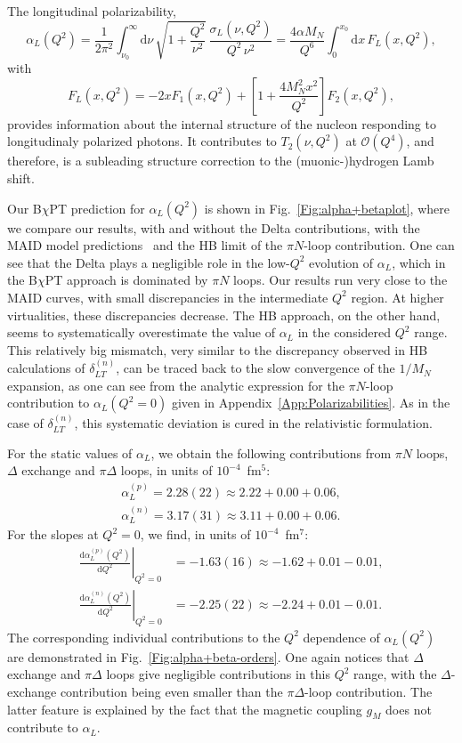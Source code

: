 \documentclass[12pt,preprint,tightenlines,
showpacs,preprintnumbers,amsmath,amssymb,
a4paper,nofootinbib]{revtex4-1}
\def\beq{\begin{equation}}
\def\eeq{\end{equation}}
\def\al{\alpha}
\def\nn{\nonumber}
\def\dd{\mathrm{d}}
\begin{document}
The longitudinal polarizability,
\beq
\alpha_L (Q^2)= \frac{1}{2 \pi^2} \int_{\nu_0}^\infty\! \dd\nu\,\sqrt{1+\frac{Q^2}{\nu^{2}}}\,            \frac{\sigma_L (\nu,Q^2)}{Q^2\, \nu^{2}} = \frac{4 \al M_N}{Q^6}\int_0^{x_0}\! \dd x \, F_L(x,Q^2),\label{Eq:alphaLQ2}
\eeq
with
\beq
F_L(x,Q^2)=-2xF_1(x,Q^2)+\left[1+\frac{4M_N^2 x^2}{Q^2}\right]F_2(x,Q^2),\nn
\eeq
provides information about the internal structure of the nucleon responding to longitudinaly polarized photons. 
It contributes to $T_2(\nu,Q^2)$ at $\mathcal{O}(Q^4)$, and therefore, is a  subleading structure correction to the (muonic-)hydrogen Lamb shift.

Our B$\chi$PT prediction for $\alpha_L(Q^2)$ is shown in Fig.~\ref{Fig:alpha+betaplot}, 
where we compare our results, with and without the Delta contributions, with the MAID model predictions~\cite{Drechsel:2000ct,Drechsel:1998hk,Drechsel:2002ar,private-Lothar} and the HB limit of the $\pi N$-loop contribution. One can see that the Delta plays a negligible role in the low-$Q^2$ evolution of $\alpha_L$, which in the B$\chi$PT approach is dominated by $\pi N$ loops.
Our results run very close to the MAID curves, with small discrepancies in the intermediate $Q^2$ region.
At higher virtualities, these discrepancies decrease.
The HB approach, on the other hand, seems to systematically overestimate the value of $\alpha_L$ in the considered $Q^2$ range. 
This relatively big mismatch, very similar to the discrepancy observed in HB calculations of $\delta_{LT}^{(n)}$, can be traced back to the slow convergence of the $1/M_N$ expansion, as one can see from the analytic expression for the $\pi N$-loop contribution to $\alpha_L(Q^2=0)$ given in  Appendix~\ref{App:Polarizabilities}.  As in the case of $\delta_{LT}^{(n)}$, this systematic deviation is cured in the relativistic formulation. 

For the static values of $\alpha_L$,
we obtain the following contributions from $\pi N$ loops,  $\Delta$ exchange and $\pi\Delta$ loops, in units of $10^{-4}$~fm$^5$:
\begin{align}
\alpha^{(p)}_L=2.28(22)\approx 2.22+ 0.00+  0.06, \\
\alpha^{(n)}_L= 3.17(31)\approx 3.11 + 0.00+ 0.06.
\end{align}
For the slopes at $Q^2=0$, we find, in units of $10^{-4}$~fm$^7$:
\begin{align}
\left.\frac{\dd\alpha^{(p)}_L (Q^2)}{\dd Q^2}\right|_{Q^2=0}&=-1.63(16)\approx  -1.62 + 0.01 - 0.01  ,  \\
\left.\frac{\dd\alpha^{(n)}_L (Q^2)}{\dd Q^2}\right|_{Q^2=0}&= -2.25(22)\approx -2.24 + 0.01 - 0.01.
\end{align}
 The corresponding individual contributions to the $Q^2$ dependence
of $\alpha_L(Q^2)$ are demonstrated in Fig.~\ref{Fig:alpha+beta-orders}. One again notices
that  $\Delta$ exchange and  $\pi \Delta$ loops give negligible contributions in this $Q^2$ range, with the $\Delta$-exchange contribution being even smaller than the $\pi \Delta$-loop contribution. 
The latter feature is explained by the fact that the magnetic coupling $g_M$ does not contribute to $\al_L$.
\end{document}
